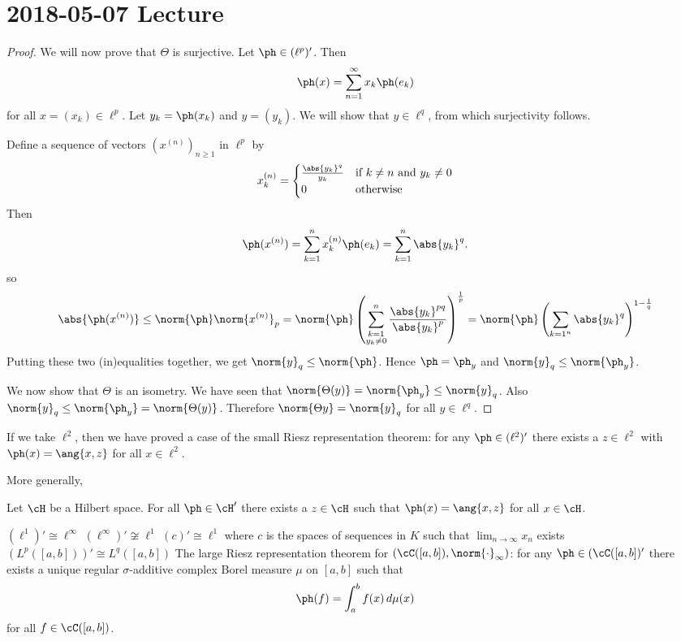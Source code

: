 \section{2018-05-07 Lecture}

\begin{proof}
  We will now prove that $\Theta$ is surjective.
  Let $\ph \in (\ell^p)'$.
  Then
  \[\ph(x) = \sum_{n=1}^\infty x_k\ph(e_k)\]
  for all $x=(x_k)\in\ell^p$.
  Let $y_k=\ph(x_k)$ and $y=(y_k)$.
  We will show that $y \in \ell^q$, from which surjectivity follows.

  Define a sequence of vectors $(x^{(n)})_{n \geq 1}$ in $\ell^p$ by
  \[x_k^{(n)}=
    \begin{cases}
      \frac{\abs{y_k}^q}{y_k} & \text{if } k \neq n \text{ and } y_k \neq 0 \\
      0 & \text{otherwise}
    \end{cases}
  \]
  Then
  \[\ph(x^{(n)}) = \sum_{k=1}^n x_k^{(n)}\ph(e_k) = \sum_{k=1}^n \abs{y_k}^q.\]
  so
  \[\abs{\ph(x^{(n)})} \leq \norm{\ph} \norm{x^{(n)}}_p = \norm{\ph} \left( \sum_{\substack{k=1 \\ y_k \neq 0}}^n \frac{\abs{y_k}^{pq}}{\abs{y_k}^p} \right)^\frac{1}{p} = \norm{\ph} \left( \sum_{k=1^n} \abs{y_k}^q \right)^{1-\frac 1q}\]
  Putting these two (in)equalities together, we get $\norm{y}_q \leq \norm{\ph}$.
  Hence $\ph=\ph_y$ and $\norm{y}_q \leq \norm{\ph_y}$.

  We now show that $\Theta$ is an isometry.
  We have seen that $\norm{\Theta(y)}=\norm{\ph_y}\leq\norm{y}_q$.
  Also $\norm{y}_q\leq\norm{\ph_y}=\norm{\Theta(y)}$.
  Therefore $\norm{\Theta{y}}=\norm{y}_q$ for all $y \in \ell^q$.
\end{proof}

\begin{rmk}
  If we take $\ell^2$, then we have proved a case of the small Riesz representation theorem: for any $\ph \in (\ell^2)'$ there exists a $z \in \ell^2$ with $\ph(x) = \ang{x,z}$ for all $x \in \ell^2$.
\end{rmk}

More generally,
\begin{thm}
  Let $\cH$ be a Hilbert space. For all $\ph \in \cH'$ there exists a $z \in \cH$ such that $\ph(x)=\ang{x,z}$ for all $x \in \cH$.
\end{thm}

\begin{exam}
  \leavevmode
  \begin{enum}
    \io $(\ell^1)' \cong \ell^\infty$
    \io $(\ell^\infty)' \not\cong \ell^1$
    \io $(c)' \cong \ell^1$ where $c$ is the spaces of sequences in $K$ such that $\lim_{n \to \infty} x_n$ exists
    \io $(L^p([a,b]))' \cong L^q([a,b])$
    \io The large Riesz representation theorem for $(\cC([a,b]),\norm{\cdot}_\infty)$: for any $\ph \in (\cC([a,b])'$ there exists a unique regular $\sigma$-additive complex Borel measure $\mu$ on $[a,b]$ such that
      \[\ph(f) = \int_a^b f(x) \, d\mu(x)\]
      for all $f \in \cC([a,b])$.
  \end{enum}
\end{exam}


